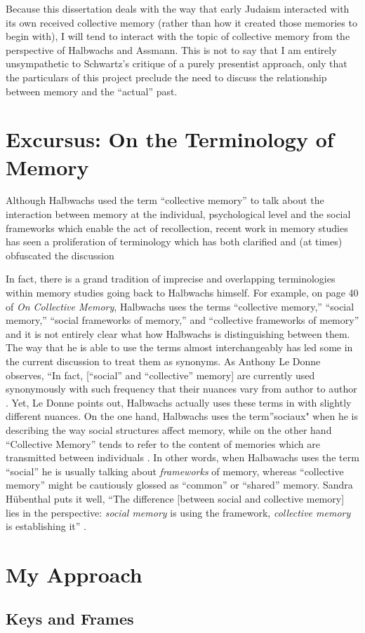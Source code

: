 Because this dissertation deals with the way that early Judaism
interacted with its own received collective memory (rather than how it
created those memories to begin with), I will tend to interact with the
topic of collective memory from the perspective of Halbwachs and
Assmann. This is not to say that I am entirely unsympathetic to
Schwartz's critique of a purely presentist approach, only that the
particulars of this project preclude the need to discuss the
relationship between memory and the ``actual'' past.

\hypertarget{excursus-on-the-terminology-of-memory}{%
\section{Excursus: On the Terminology of
Memory}\label{excursus-on-the-terminology-of-memory}}

Although Halbwachs used the term ``collective memory'' to talk about the
interaction between memory at the individual, psychological level and
the social frameworks which enable the act of recollection, recent work
in memory studies has seen a proliferation of terminology which has both
clarified and (at times) obfuscated the discussion

In fact, there is a grand tradition of imprecise and overlapping
terminologies within memory studies going back to Halbwachs himself. For
example, on page 40 of \emph{On Collective Memory}, Halbwachs uses the
terms ``collective memory,'' ``social memory,'' ``social frameworks of
memory,'' and ``collective frameworks of memory'' and it is not entirely
clear what how Halbwachs is distinguishing between them. The way that he
is able to use the terms almost interchangeably has led some in the
current discussion to treat them as synonyms. As Anthony Le Donne
observes, ``In fact, {[}``social'' and ``collective'' memory{]} are
currently used synonymously with such frequency that their nuances vary
from author to author \autocite[42 n.8]{ledonne2009}. Yet, Le Donne
points out, Halbwachs actually uses these terms in with slightly
different nuances. On the one hand, Halbwachs uses the term''sociaux"
when he is describing the way social structures affect memory, while on
the other hand ``Collective Memory'' tends to refer to the content of
memories which are transmitted between individuals \autocite[42
n.8]{ledonne2009}. In other words, when Halbawachs uses the term
``social'' he is usually talking about \emph{frameworks} of memory,
whereas ``collective memory'' might be cautiously glossed as ``common''
or ``shared'' memory. Sandra Hübenthal puts it well, ``The difference
{[}between social and collective memory{]} lies in the perspective:
\emph{social memory} is using the framework, \emph{collective memory} is
establishing it'' \autocite[180]{hubenthal_carstens-hasselbalch2012}.

\hypertarget{my-approach}{%
\section{My Approach}\label{my-approach}}

\hypertarget{keys-and-frames}{%
\subsection{Keys and Frames}\label{keys-and-frames}}
